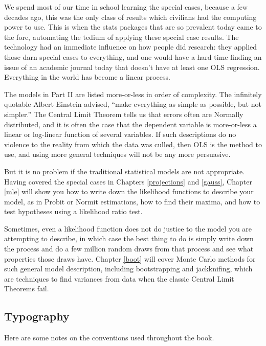 \begin{multicols}{2}
We spend most of our time in school learning the special cases,
because a few decades ago, this was the only class of results which
civilians had the computing power to use. This is when the stats packages
that are so prevalent today came to the fore, automating the tedium of
applying these special case results. The technology had an immediate
influence on how people did research: they applied those darn special
cases to everything, and one would have a hard time finding an issue of an
academic journal today that doesn't have at least one OLS regression.
Everything in the world has become a linear process.


The models in Part II are listed more-or-less in order of complexity.
The infinitely quotable Albert Einstein advised, ``make everything as
simple as possible, but not simpler.''  
The Central Limit Theorem tells us that errors often are
Normally distributed, and it is often the case that the dependent
variable is more-or-less a linear or log-linear function of several
variables. If such descriptions do no violence to the reality from
which the data was culled, then OLS is the method to use, and using more
general techniques will not be any more persuasive. 

But it is no problem if the traditional statistical models are not appropriate.
Having covered the special cases in Chapters \ref{projections}
and \ref{gauss}, Chapter \ref{mle} will show you how to write down the
likelihood functions to describe your model, as in Probit or Normit
estimations, how to find their maxima, and how to test hypotheses using
a likelihood ratio test.

Sometimes, even a likelihood function does not do justice to the model
you are attempting to describe, in which case the best thing to do is
simply write down the process and do a few million random draws from
that process and see what properties those draws have.
Chapter \ref{boot} will cover Monte Carlo methods for such general
model description, including bootstrapping and jackknifing, which are
techniques to find variances from data when the classic Central Limit
Theorems fail.  

  

\subsection{Typography}
Here are some notes on the conventions used throughout the book.


\end{multicols}

